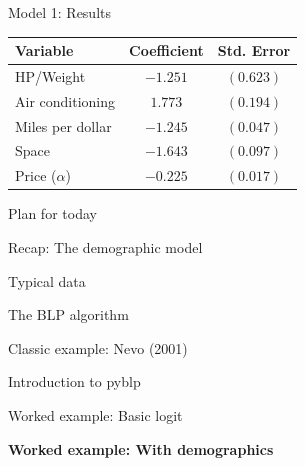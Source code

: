\documentclass[notes,11pt, aspectratio=169]{beamer}
\newenvironment{wideenumerate}{\enumerate\addtolength{\itemsep}{10pt}}{\endenumerate}
\begin{document}
\begin{frame}{Model 1: Results}
	\begin{center}
		\begin{tabular}{lcc}
			\toprule
			\textbf{Variable} & \textbf{Coefficient} & \textbf{Std. Error} \\
			\midrule
			HP/Weight & $-1.251$ & $(0.623)$ \\
			Air conditioning & $1.773$ & $(0.194)$ \\
			Miles per dollar & $-1.245$ & $(0.047)$ \\
			Space & $-1.643$ & $(0.097)$ \\
			Price ($\alpha$) & $-0.225$ & $(0.017)$ \\
			\bottomrule
		\end{tabular}
	\end{center}
\end{frame}


\begin{frame}{Plan for today}
  \begin{wideenumerate}
    \item Recap: The demographic model
    \item Typical data
    \item The BLP algorithm
    \item Classic example: Nevo (2001)
    \item Introduction to pyblp
    \item Worked example: Basic logit
    \item \textbf{Worked example: With demographics}
  \end{wideenumerate}
\end{frame}
\end{document}
